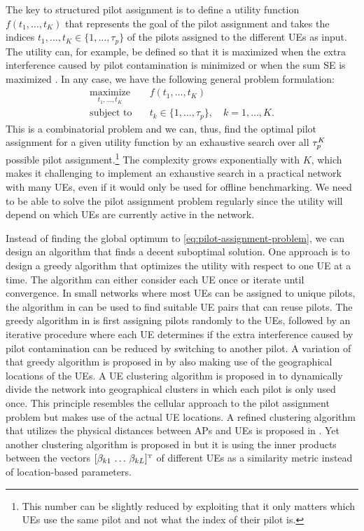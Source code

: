 The key to structured pilot assignment is to define a utility function $f(t_1,\ldots,t_K)$ that represents the goal of the pilot assignment and takes the indices $t_1,\ldots,t_K \in \{ 1,\ldots,\tau_p\}$ of the pilots assigned to the different UEs as input.
The utility can, for example, be defined so that it is maximized when the extra interference caused by pilot contamination is minimized \cite{Ngo2017b} or when the sum SE is maximized \cite{Liu2020a}. In any case, we have the following general problem formulation:
\begin{align} \label{eq:pilot-assignment-problem}
\underset{t_1,\ldots,t_K}{\textrm{maximize}} & \quad f(t_1,\ldots,t_K) \\
\textrm{subject to} &\quad t_k \in \{ 1, \ldots, \tau_p \}, \quad k=1,\ldots,K. \nonumber
\end{align}
This is a combinatorial problem and we can, thus, find the optimal pilot assignment for a given utility function by an exhaustive search over all $\tau_{p}^K$ possible pilot assignment.\footnote{This number can be slightly reduced by exploiting that it only matters which UEs use the same pilot and not what the index of their pilot is.}
The complexity grows exponentially with $K$, which makes it challenging to implement an exhaustive search in a practical network with many UEs, even if it would only be used for offline benchmarking. We need to be able to solve the pilot assignment problem regularly since the utility will depend on which UEs are currently active in the network.

Instead of finding the global optimum to \eqref{eq:pilot-assignment-problem}, we can design an algorithm that finds a decent suboptimal solution. One approach is to design a greedy algorithm that optimizes the utility with respect to one UE at a time. The algorithm can either consider each UE once or iterate until convergence. In small networks where most UEs can be assigned to unique pilots, the algorithm in \cite{Sabbagh2018a} can be used to find suitable UE pairs that can reuse pilots.
The greedy algorithm in \cite{Ngo2017b} is first assigning pilots randomly to the UEs, followed by an iterative procedure where each UE determines if the extra interference caused by pilot contamination can be reduced by switching to another pilot. 
A variation of that greedy algorithm is proposed in \cite{Zhang2018b} by also making use of the geographical locations of the UEs.
A UE clustering algorithm is proposed in \cite{Attarifar2018a} to dynamically divide the network into geographical clusters in which each pilot is only used once. This principle resembles the cellular approach to the pilot assignment problem but makes use of the actual UE locations.
A refined clustering algorithm that utilizes the physical distances between APs and UEs is proposed in \cite{Chen2020a}.
Yet another clustering algorithm is proposed in \cite{Femenias2019a} but it is using the inner products between the vectors $[\beta_{k1} \, \ldots \, \beta_{kL}]^{\Ttran}$ of different UEs as a similarity metric instead of location-based parameters.

